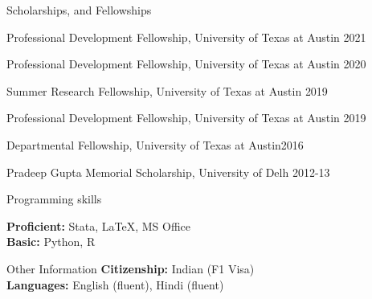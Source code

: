 \documentclass{resume} %
\begin{document}

\begin{rSection}{Scholarships, and Fellowships
}
\begin{rSubsection}{}{}{}{}

\item[]Professional Development Fellowship, University of Texas at Austin \hfill{2021}
\item[]Professional Development Fellowship, University of Texas at Austin \hfill{2020}
\item[]Summer Research Fellowship, University of Texas at Austin  \hfill{2019} 
\item[]Professional Development Fellowship, University of Texas at Austin \hfill{2019}
\item[] Departmental Fellowship, University of Texas at Austin\hfill{2016}
\item[] Pradeep Gupta Memorial Scholarship, University of Delh \hfill{2012-13}
\end{rSubsection}
\end{rSection}





\begin{rSection}{Programming skills}

{\bf Proficient:} Stata, LaTeX, MS Office
\\ {\bf Basic:} Python, R \\

\end{rSection}

\begin{rSection}{Other Information} 
{\bf Citizenship:} Indian (F1 Visa)
\\ {\bf Languages:} English (fluent), Hindi (fluent)  \\

\end{rSection}
\end{document}
